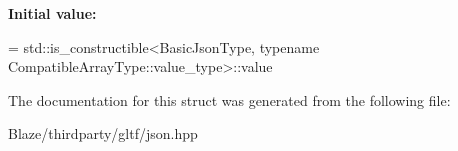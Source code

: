 {\bfseries Initial value\+:}
\begin{DoxyCode}
=
                std::is\_constructible<BasicJsonType,
                \textcolor{keyword}{typename} CompatibleArrayType::value\_type>::value
\end{DoxyCode}


The documentation for this struct was generated from the following file\+:\begin{DoxyCompactItemize}
\item 
Blaze/thirdparty/gltf/json.\+hpp\end{DoxyCompactItemize}
